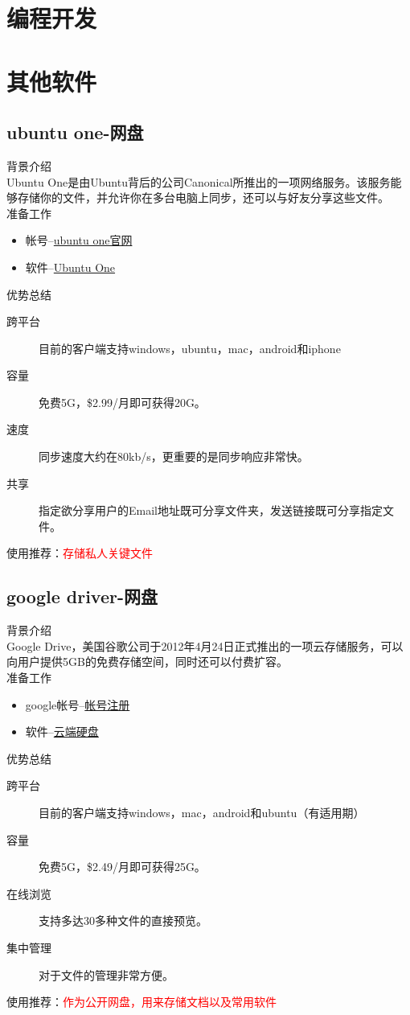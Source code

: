 \section{编程开发}
\clearpage
\section{其他软件}
\subsection{ubuntu one-网盘}
背景介绍\\

Ubuntu One是由Ubuntu背后的公司Canonical所推出的一项网络服务。该服务能够存储你的文件，并允许你在多台电脑上同步，还可以与好友分享这些文件。\\
准备工作
\begin{itemize}
\item 帐号--\href{https://one.ubuntu.com/dashboard}{ubuntu one官网}
\item 软件--\href{https://one.ubuntu.com/downloads/windows/}{Ubuntu One}
\end{itemize} 
优势总结
\begin{description}
\item[跨平台] 目前的客户端支持windows，ubuntu，mac，android和iphone
\item[容量] 免费5G，\$2.99/月即可获得20G。
\item[速度] 同步速度大约在80kb/s，更重要的是同步响应非常快。
\item[共享] 指定欲分享用户的Email地址既可分享文件夹，发送链接既可分享指定文件。
\end{description}
使用推荐：\textcolor{red}{存储私人关键文件}

\subsection{google driver-网盘}
背景介绍\\

Google Drive，美国谷歌公司于2012年4月24日正式推出的一项云存储服务，可以向用户提供5GB的免费存储空间，同时还可以付费扩容。\\
准备工作
\begin{itemize}
\item google帐号--\href{https://accounts.google.com/SignUp?hl=zh-CN}{帐号注册}
\item 软件--\href{http://drive.google.com}{云端硬盘}
\end{itemize} 
优势总结
\begin{description}
\item[跨平台] 目前的客户端支持windows，mac，android和ubuntu（有适用期）
\item[容量] 免费5G，\$2.49/月即可获得25G。
\item[在线浏览] 支持多达30多种文件的直接预览。
\item[集中管理] 对于文件的管理非常方便。
\end{description}
使用推荐：\textcolor{red}{作为公开网盘，用来存储文档以及常用软件}


